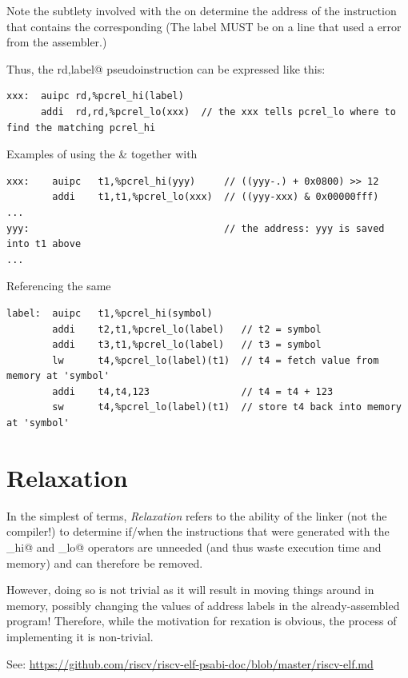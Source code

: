 Note the subtlety involved with the \verb@lab@ on \verb@%pcrel_lo@. It is needed to
determine the address of the instruction that contains the corresponding \verb@%pcrel_hi@.
(The label \verb@lab@ MUST be on a line that used a \verb@%pcrel_hi()@ or get an
error from the assembler.)

Thus, the \verb@la rd,label@ pseudoinstruction can be expressed like this:
{\small
\begin{verbatim}
xxx:  auipc rd,%pcrel_hi(label)
      addi  rd,rd,%pcrel_lo(xxx)  // the xxx tells pcrel_lo where to find the matching pcrel_hi
\end{verbatim}
}

Examples of using the \verb@auipc@ \& \verb@addi@ together with \verb@%pcrel_hi()@ and
\verb@%pcrel_lo()@:

{\small
\begin{verbatim}
xxx:    auipc   t1,%pcrel_hi(yyy)     // ((yyy-.) + 0x0800) >> 12
        addi    t1,t1,%pcrel_lo(xxx)  // ((yyy-xxx) & 0x00000fff)
...
yyy:                                  // the address: yyy is saved into t1 above
...
\end{verbatim}
}


Referencing the same \verb@%pcrel_hi@ in multiple subsequent uses of \verb@%pcrel_lo@ is legal:
{\small
\begin{verbatim}
label:  auipc   t1,%pcrel_hi(symbol)
        addi    t2,t1,%pcrel_lo(label)   // t2 = symbol
        addi    t3,t1,%pcrel_lo(label)   // t3 = symbol
        lw      t4,%pcrel_lo(label)(t1)  // t4 = fetch value from memory at 'symbol'
        addi    t4,t4,123                // t4 = t4 + 123
        sw      t4,%pcrel_lo(label)(t1)  // store t4 back into memory at 'symbol'
\end{verbatim}
}

\section{Relaxation}

In the simplest of terms, {\em Relaxation} refers to the ability of the
linker (not the compiler!) to determine if/when the instructions that
were generated with the \verb@xxx_hi@ and \verb@xxx_lo@ operators are
unneeded (and thus waste execution time and memory) and can therefore
be removed.

However, doing so is not trivial as it will result in moving things around
in memory, possibly changing the values of address labels in the
already-assembled program!  Therefore, while the motivation for
rexation is obvious, the process of implementing it is non-trivial.

See: \url{https://github.com/riscv/riscv-elf-psabi-doc/blob/master/riscv-elf.md}